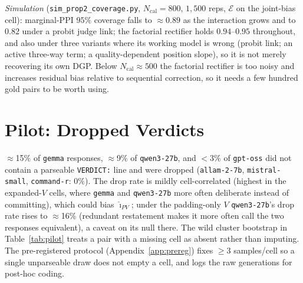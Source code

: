 \documentclass{article}
\newcommand{\Ncal}{N_{\mathrm{cal}}}
\begin{document}
\noindent \emph{Simulation} (\texttt{sim\_prop2\_coverage.py},
$\Ncal{=}800$, $1{,}500$ reps, $\mathcal{E}$ on the joint-bias
cell): marginal-PPI $95\%$ coverage falls to $\approx0.89$ as the
interaction grows and to $0.82$ under a probit judge link; the
factorial rectifier holds $0.94$--$0.95$ throughout, and also under
three variants where its working model is wrong (probit link; an
active three-way term; a quality-dependent position slope), so it is
not merely recovering its own DGP. Below $\Ncal\approx500$ the
factorial rectifier is too noisy and increases residual bias
relative to sequential correction, so it needs a few hundred gold
pairs to be worth using.

\section{Pilot: Dropped Verdicts}
\label{app:validation}
$\approx$15\% of \texttt{gemma} responses, $\approx$9\% of
\texttt{qwen3-27b}, and ${<}3\%$ of \texttt{gpt-oss} did not
contain a parseable \texttt{VERDICT:} line and were dropped
(\texttt{allam-2-7b}, \texttt{mistral-small}, \texttt{command-r}:
$0\%$). The drop rate is mildly cell-correlated
(highest in the expanded-$V$ cells, where \texttt{gemma} and
\texttt{qwen3-27b} more often deliberate instead of committing),
which could bias $\hat\imath_{PV}$; under the padding-only $V$
\texttt{qwen3-27b}'s drop rate rises to $\approx$16\% (redundant
restatement makes it more often call the two responses equivalent),
a caveat on its null there. The wild
cluster bootstrap in Table~\ref{tab:pilot} treats a pair with a
missing cell as absent rather than imputing. The pre-registered
protocol (Appendix~\ref{app:prereg}) fixes $\geq3$ samples/cell so a
single unparseable draw does not empty a cell, and logs the raw
generations for post-hoc coding.
\end{document}
